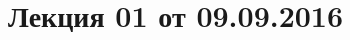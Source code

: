 \documentclass[a4paper, 12pt]{article}
\begin{document}
\pagestyle{fancy}
\section{Лекция 01 от 09.09.2016}
\end{document}
